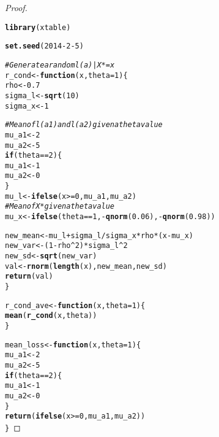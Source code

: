 \documentclass[letterpaper, 12pt]{article}\usepackage[]{graphicx}\usepackage[]{color}
\makeatletter
\newcommand{\hlnum}[1]{\textcolor[rgb]{0.686,0.059,0.569}{#1}}%
\newcommand{\hlcom}[1]{\textcolor[rgb]{0.678,0.584,0.686}{\textit{#1}}}%
\newcommand{\hlopt}[1]{\textcolor[rgb]{0,0,0}{#1}}%
\newcommand{\hlstd}[1]{\textcolor[rgb]{0.345,0.345,0.345}{#1}}%
\newcommand{\hlkwa}[1]{\textcolor[rgb]{0.161,0.373,0.58}{\textbf{#1}}}%
\newcommand{\hlkwb}[1]{\textcolor[rgb]{0.69,0.353,0.396}{#1}}%
\newcommand{\hlkwc}[1]{\textcolor[rgb]{0.333,0.667,0.333}{#1}}%
\newcommand{\hlkwd}[1]{\textcolor[rgb]{0.737,0.353,0.396}{\textbf{#1}}}%
\newenvironment{kframe}{%
 \def\at@end@of@kframe{}%
 \ifinner\ifhmode%
  \def\at@end@of@kframe{\end{minipage}}%
  \begin{minipage}{\columnwidth}%
 \fi\fi%
 \def\FrameCommand##1{\hskip\@totalleftmargin \hskip-\fboxsep
 \colorbox{shadecolor}{##1}\hskip-\fboxsep
     \hskip-\linewidth \hskip-\@totalleftmargin \hskip\columnwidth}%
 \MakeFramed {\advance\hsize-\width
   \@totalleftmargin\z@ \linewidth\hsize
   \@setminipage}}%
 {\par\unskip\endMakeFramed%
 \at@end@of@kframe}
\newenvironment{knitrout}{}{} %
\makeatother
\begin{document}
\begin{proof}
\begin{enumerate}[(1)]
\end{enumerate}

\begin{knitrout}
\color{fgcolor}\begin{kframe}
\begin{alltt}
\hlkwd{library}\hlstd{(xtable)}

\hlkwd{set.seed}\hlstd{(}\hlnum{2014} \hlopt{-} \hlnum{2} \hlopt{-} \hlnum{5}\hlstd{)}

\hlcom{# Generate a random l(a) | X* = x}
\hlstd{r_cond} \hlkwb{<-} \hlkwa{function}\hlstd{(}\hlkwc{x}\hlstd{,} \hlkwc{theta} \hlstd{=} \hlnum{1}\hlstd{) \{}
    \hlstd{rho} \hlkwb{<-} \hlnum{0.7}
    \hlstd{sigma_l} \hlkwb{<-} \hlkwd{sqrt}\hlstd{(}\hlnum{10}\hlstd{)}
    \hlstd{sigma_x} \hlkwb{<-} \hlnum{1}

    \hlcom{# Mean of l(a1) and l(a2) given a theta value}
    \hlstd{mu_a1} \hlkwb{<-} \hlnum{2}
    \hlstd{mu_a2} \hlkwb{<-} \hlnum{5}
    \hlkwa{if} \hlstd{(theta} \hlopt{==} \hlnum{2}\hlstd{) \{}
        \hlstd{mu_a1} \hlkwb{<-} \hlnum{1}
        \hlstd{mu_a2} \hlkwb{<-} \hlnum{0}
    \hlstd{\}}
    \hlstd{mu_l} \hlkwb{<-} \hlkwd{ifelse}\hlstd{(x} \hlopt{>=} \hlnum{0}\hlstd{, mu_a1, mu_a2)}
    \hlcom{# Mean of X* given a theta value}
    \hlstd{mu_x} \hlkwb{<-} \hlkwd{ifelse}\hlstd{(theta} \hlopt{==} \hlnum{1}\hlstd{,} \hlopt{-}\hlkwd{qnorm}\hlstd{(}\hlnum{0.06}\hlstd{),} \hlopt{-}\hlkwd{qnorm}\hlstd{(}\hlnum{0.98}\hlstd{))}

    \hlstd{new_mean} \hlkwb{<-} \hlstd{mu_l} \hlopt{+} \hlstd{sigma_l}\hlopt{/}\hlstd{sigma_x} \hlopt{*} \hlstd{rho} \hlopt{*} \hlstd{(x} \hlopt{-} \hlstd{mu_x)}
    \hlstd{new_var} \hlkwb{<-} \hlstd{(}\hlnum{1} \hlopt{-} \hlstd{rho}\hlopt{^}\hlnum{2}\hlstd{)} \hlopt{*} \hlstd{sigma_l}\hlopt{^}\hlnum{2}
    \hlstd{new_sd} \hlkwb{<-} \hlkwd{sqrt}\hlstd{(new_var)}
    \hlstd{val} \hlkwb{<-} \hlkwd{rnorm}\hlstd{(}\hlkwd{length}\hlstd{(x), new_mean, new_sd)}
    \hlkwd{return}\hlstd{(val)}
\hlstd{\}}

\hlstd{r_cond_ave} \hlkwb{<-} \hlkwa{function}\hlstd{(}\hlkwc{x}\hlstd{,} \hlkwc{theta} \hlstd{=} \hlnum{1}\hlstd{) \{}
    \hlkwd{mean}\hlstd{(}\hlkwd{r_cond}\hlstd{(x, theta))}
\hlstd{\}}

\hlstd{mean_loss} \hlkwb{<-} \hlkwa{function}\hlstd{(}\hlkwc{x}\hlstd{,} \hlkwc{theta} \hlstd{=} \hlnum{1}\hlstd{) \{}
    \hlstd{mu_a1} \hlkwb{<-} \hlnum{2}
    \hlstd{mu_a2} \hlkwb{<-} \hlnum{5}
    \hlkwa{if} \hlstd{(theta} \hlopt{==} \hlnum{2}\hlstd{) \{}
        \hlstd{mu_a1} \hlkwb{<-} \hlnum{1}
        \hlstd{mu_a2} \hlkwb{<-} \hlnum{0}
    \hlstd{\}}
    \hlkwd{return}\hlstd{(}\hlkwd{ifelse}\hlstd{(x} \hlopt{>=} \hlnum{0}\hlstd{, mu_a1, mu_a2))}
\hlstd{\}}


\end{alltt}
\end{kframe}
\end{knitrout}
\end{proof}
\end{document}
